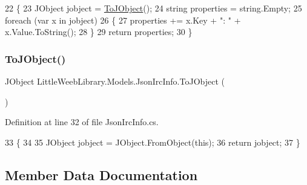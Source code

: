 \begin{DoxyCode}
22         \{
23             JObject jobject = \mbox{\hyperlink{class_little_weeb_library_1_1_models_1_1_json_irc_info_a477f060b125dfcc0464e41d0dca94acf}{ToJObject}}();
24             \textcolor{keywordtype}{string} properties = \textcolor{keywordtype}{string}.Empty;
25             \textcolor{keywordflow}{foreach} (var x \textcolor{keywordflow}{in} jobject)
26             \{
27                 properties += x.Key + \textcolor{stringliteral}{": "} + x.Value.ToString();
28             \}
29             \textcolor{keywordflow}{return} properties;
30         \}
\end{DoxyCode}
\mbox{\label{class_little_weeb_library_1_1_models_1_1_json_irc_info_a477f060b125dfcc0464e41d0dca94acf}} 
\subsubsection{\texorpdfstring{To\+J\+Object()}{ToJObject()}}
{\footnotesize\ttfamily J\+Object Little\+Weeb\+Library.\+Models.\+Json\+Irc\+Info.\+To\+J\+Object (\begin{DoxyParamCaption}{ }\end{DoxyParamCaption})}



Definition at line 32 of file Json\+Irc\+Info.\+cs.


\begin{DoxyCode}
33         \{
34 
35             JObject jobject = JObject.FromObject(\textcolor{keyword}{this});
36             \textcolor{keywordflow}{return} jobject;
37         \}
\end{DoxyCode}


\subsection{Member Data Documentation}
\mbox{\label{class_little_weeb_library_1_1_models_1_1_json_irc_info_afe4b739c9c9d3e79e56197dadb88a16a}} 

